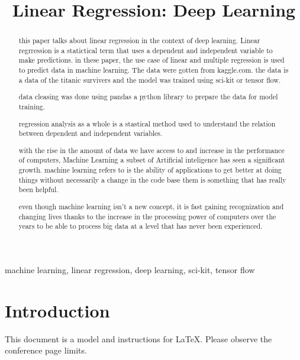 \documentclass[conference]{IEEEtran}
\begin{document}
\title{Linear Regression: Deep Learning}

\author{
}

\maketitle

\begin{abstract}
this paper talks about linear regression in the context of deep learning. Linear regrression is a statictical term that uses a dependent and independent variable to make predictions. in these paper, the use case of linear and multiple regression is used to predict data in machine learning. The data were gotten from kaggle.com. the data is a data of the titanic survivers and the model was trained using sci-kit or tensor flow.

data cleasing was done using pandas a python library to prepare the data for model training.

regression analysis as a whole is a stastical method used to understand the relation between dependent and independent variables.


with the rise in the amount of data we have access to and increase in the performance of computers, Machine Learning a subset of Artificial inteligence has seen a significant growth. machine learning refers to  is the ability of applications to get better at doing things without necessarily a change in the code base them is something that has really been helpful. 

even though machine learning isn't a new concept, it is fast gaining recognization and changing lives thanks to the increase in the processing power of computers over the years to be able to process big data at a level that has never been experienced.


\end{abstract}

\begin{IEEEkeywords}
machine learning, linear regression, deep learning, sci-kit, tensor flow
\end{IEEEkeywords}

\section{Introduction}
This document is a model and instructions for \LaTeX.
Please observe the conference page limits. 
\end{document}
